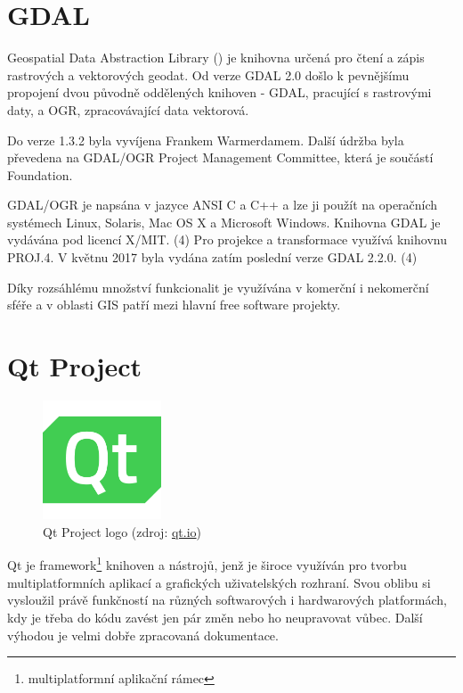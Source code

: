   
\section{GDAL}

Geospatial Data Abstraction Library () je knihovna určená pro
čtení a zápis rastrových a vektorových geodat. Od verze GDAL 2.0 došlo
k pevnějšímu propojení dvou původně oddělených knihoven - GDAL,
pracující s rastrovými daty, a OGR, zpracovávající data vektorová.

Do verze 1.3.2 byla vyvíjena Frankem Warmerdamem. Další údržba byla
převedena na GDAL/OGR Project Management Committee, která je součástí
 Foundation.

GDAL/OGR je napsána v jazyce ANSI C a C++ a lze ji použít na
operačních systémech Linux, Solaris, Mac OS X a Microsoft
Windows. Knihovna GDAL je vydávána pod licencí X/MIT. (4) Pro projekce
a transformace využívá knihovnu PROJ.4. V květnu 2017 byla vydána
zatím poslední verze GDAL 2.2.0. (4)

Díky rozsáhlému množství funkcionalit je využívána v komerční i
nekomerční sféře a v oblasti GIS patří mezi hlavní free software
projekty.


\section{Qt Project}

\begin{figure}[H] \centering
      \includegraphics[width=100pt]{./pictures/qt_logo_green_256x256px.png}
      \caption[Qt Project logo]{Qt Project logo (zdroj:
\href{http://brand.qt.io/downloads/}{qt.io})}
      \label{fig:qt}
  \end{figure}

Qt je framework\footnote{multiplatformní aplikační rámec} knihoven a
nástrojů, jenž je široce využíván pro tvorbu multiplatformních
aplikací a grafických uživatelských rozhraní. Svou oblibu si vysloužil
právě funkčností na různých softwarových i hardwarových platformách,
kdy je třeba do kódu zavést jen pár změn nebo ho neupravovat
vůbec. Další výhodou je velmi dobře zpracovaná dokumentace.

